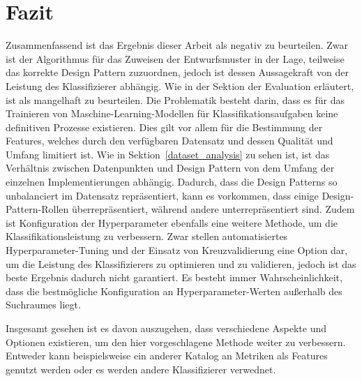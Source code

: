 \section{Fazit}

Zusammenfassend ist das Ergebnis dieser Arbeit als negativ zu beurteilen. Zwar ist der Algorithmus für das Zuweisen der Entwurfsmuster in der Lage, teilweise das korrekte Design Pattern zuzuordnen,
jedoch ist dessen Aussagekraft von der Leistung des Klassifizierer abhängig. Wie in der Sektion der Evaluation erläutert, ist als mangelhaft zu beurteilen.
Die Problematik besteht darin, dass es für das Trainieren von Maschine-Learning-Modellen für Klassifikationsaufgaben keine definitiven Prozesse existieren.
Dies gilt vor allem für die Bestimmung der Features, welches durch den verfügbaren Datensatz und dessen Qualität und Umfang limitiert ist. 
Wie in Sektion~\ref{dataset_analysis} zu sehen ist, ist das Verhältnis zwischen Datenpunkten und Design Pattern von dem Umfang der einzelnen Implementierungen abhängig. Dadurch, dass die Design Patterns so unbalanciert im Datensatz repräsentiert, kann es vorkommen,
dass einige Design-Pattern-Rollen überrepräsentiert, während andere unterrepräsentiert sind. Zudem ist Konfiguration der Hyperparameter ebenfalls eine weitere Methode,
um die Klassifikationsleistung zu verbessern. Zwar stellen automatisiertes Hyperparameter-Tuning und der Einsatz von Kreuzvalidierung eine Option dar, um die Leistung des Klassifizierers zu optimieren und zu validieren,
jedoch ist das beste Ergebnis dadurch nicht garantiert. Es besteht immer Wahrscheinlichkeit, dass die bestmögliche Konfiguration an Hyperparameter-Werten außerhalb des Suchraumes liegt.

Insgesamt gesehen ist es davon auszugehen, dass verschiedene Aspekte und Optionen existieren, um den hier vorgeschlagene Methode weiter zu verbessern. 
Entweder kann beispielsweise ein anderer Katalog an Metriken als Features genutzt werden oder es werden andere Klassifizierer verwednet.

